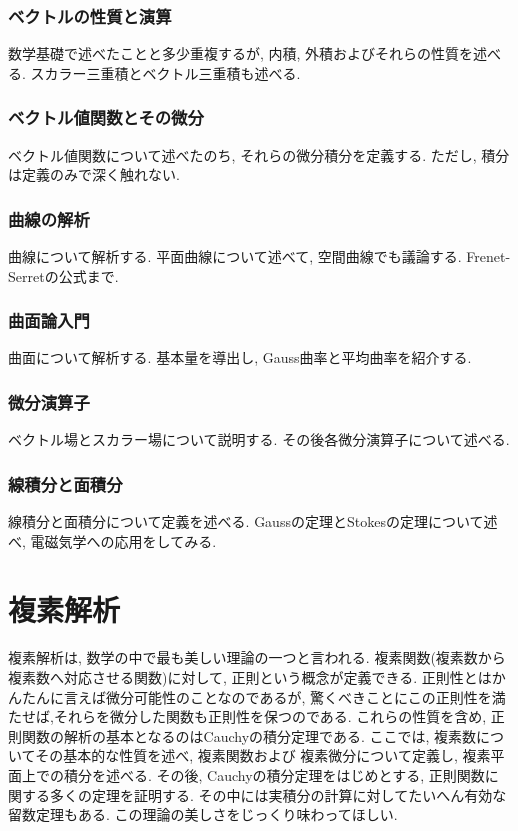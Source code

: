 \documentclass[a4j,dvipdfmx]{jsarticle}
\numberwithin{equation}{section}
\begin{document}
    \section{ベクトルの性質と演算}
        数学基礎で述べたことと多少重複するが, 内積, 外積およびそれらの性質を述べる. スカラー三重積とベクトル三重積も述べる.
    \clearpage
    \section{ベクトル値関数とその微分}
        ベクトル値関数について述べたのち, それらの微分積分を定義する. ただし, 積分は定義のみで深く触れない.
    \clearpage
    \section{曲線の解析}
        曲線について解析する. 平面曲線について述べて, 空間曲線でも議論する. Frenet-Serretの公式まで.
    \clearpage
    \section{曲面論入門}
        曲面について解析する. 基本量を導出し, Gauss曲率と平均曲率を紹介する.
    \clearpage
    \section{微分演算子}
        ベクトル場とスカラー場について説明する. その後各微分演算子について述べる.
    \clearpage
    \section{線積分と面積分}
        線積分と面積分について定義を述べる. Gaussの定理とStokesの定理について述べ, 電磁気学への応用をしてみる.
    \clearpage

    \part{複素解析}
    \begin{screen}
        複素解析は, 数学の中で最も美しい理論の一つと言われる. 複素関数(複素数から複素数へ対応させる関数)に対して, 正則という概念が定義できる.
        正則性とはかんたんに言えば微分可能性のことなのであるが, 驚くべきことにこの正則性を満たせば,それらを微分した関数も正則性を保つのである. 
        これらの性質を含め, 正則関数の解析の基本となるのはCauchyの積分定理である. ここでは, 複素数についてその基本的な性質を述べ, 複素関数および
        複素微分について定義し, 複素平面上での積分を述べる. その後, Cauchyの積分定理をはじめとする, 正則関数に関する多くの定理を証明する.
        その中には実積分の計算に対してたいへん有効な留数定理もある. この理論の美しさをじっくり味わってほしい.
    \end{screen}
    \clearpage
\end{document}
